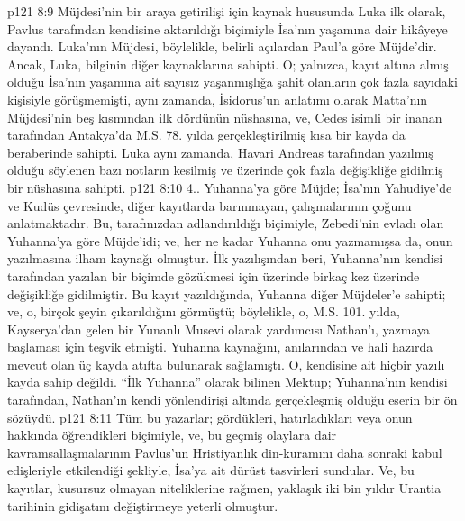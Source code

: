 \vs p121 8:9 Müjdesi’nin bir araya getirilişi için kaynak hususunda Luka ilk olarak, Pavlus tarafından kendisine aktarıldığı biçimiyle İsa’nın yaşamına dair hikâyeye dayandı. Luka’nın Müjdesi, böylelikle, belirli açılardan Paul’a göre Müjde’dir. Ancak, Luka, bilginin diğer kaynaklarına sahipti. O; yalnızca, kayıt altına almış olduğu İsa’nın yaşamına ait sayısız yaşanmışlığa şahit olanların çok fazla sayıdaki kişisiyle görüşmemişti, aynı zamanda, İsidorus’un anlatımı olarak Matta’nın Müjdesi’nin beş kısmından ilk dördünün nüshasına, ve, Cedes isimli bir inanan tarafından Antakya’da M.S. 78. yılda gerçekleştirilmiş kısa bir kayda da beraberinde sahipti. Luka aynı zamanda, Havari Andreas tarafından yazılmış olduğu söylenen bazı notların kesilmiş ve üzerinde çok fazla değişikliğe gidilmiş bir nüshasına sahipti.
\vs p121 8:10 4.\bibnobreakspace {}. Yuhanna’ya göre Müjde; İsa’nın Yahudiye’de ve Kudüs çevresinde, diğer kayıtlarda barınmayan, çalışmalarının çoğunu anlatmaktadır. Bu, tarafınızdan adlandırıldığı biçimiyle, Zebedi’nin evladı olan Yuhanna’ya göre Müjde’idi; ve, her ne kadar Yuhanna onu yazmamışsa da, onun yazılmasına ilham kaynağı olmuştur. İlk yazılışından beri, Yuhanna’nın kendisi tarafından yazılan bir biçimde gözükmesi için üzerinde birkaç kez üzerinde değişikliğe gidilmiştir. Bu kayıt yazıldığında, Yuhanna diğer Müjdeler’e sahipti; ve, o, birçok şeyin çıkarıldığını görmüştü; böylelikle, o, M.S. 101. yılda, Kayserya’dan gelen bir Yunanlı Musevi olarak yardımcısı Nathan’ı, yazmaya başlaması için teşvik etmişti. Yuhanna kaynağını, anılarından ve hali hazırda mevcut olan üç kayda atıfta bulunarak sağlamıştı. O, kendisine ait hiçbir yazılı kayda sahip değildi. “İlk Yuhanna” olarak bilinen Mektup; Yuhanna’nın kendisi tarafından, Nathan’ın kendi yönlendirişi altında gerçekleşmiş olduğu eserin bir ön sözüydü.
\vs p121 8:11 Tüm bu yazarlar; gördükleri, hatırladıkları veya onun hakkında öğrendikleri biçimiyle, ve, bu geçmiş olaylara dair kavramsallaşmalarının Pavlus’un Hristiyanlık din\hyp{}kuramını daha sonraki kabul edişleriyle etkilendiği şekliyle, İsa’ya ait dürüst tasvirleri sundular. Ve, bu kayıtlar, kusursuz olmayan niteliklerine rağmen, yaklaşık iki bin yıldır Urantia tarihinin gidişatını değiştirmeye yeterli olmuştur.

